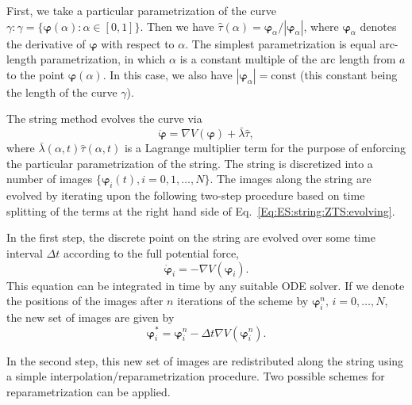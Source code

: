 First, we take a particular parametrization of the curve $\gamma:\gamma=\{\boldsymbol{\varphi}(\alpha):\alpha\in[0,1]\}$. Then we have $\hat{\tau}(\alpha)=\boldsymbol{\varphi}_\alpha/|\boldsymbol{\varphi}_\alpha|$, where $\boldsymbol{\varphi}_\alpha$ denotes the derivative of $\boldsymbol{\varphi}$ with respect to $\alpha$. The simplest parametrization is equal arc-length parametrization, in which $\alpha$ is a constant multiple of the arc length from $a$ to the point $\boldsymbol{\varphi}(\alpha)$. In this case, we also have $|\boldsymbol{\varphi}_\alpha|=\mathrm{const}$ (this constant being the length of the curve $\gamma$).

The string method evolves the curve via
\begin{equation}
    \dot{\boldsymbol{\varphi}}=\nabla V(\boldsymbol{\varphi})+\bar{\lambda}\hat{\tau},
    \label{Eq:ES:string:ZTS:evolving}
\end{equation}
where $\bar{\lambda}(\alpha,t)\hat{\tau}(\alpha,t)$ is a Lagrange multiplier term for the purpose of enforcing the particular parametrization of the string. The string is discretized into a number of images $\{\boldsymbol{\varphi}_i(t),i=0,1,\dots,N\}$. The images along the string are evolved by iterating upon the following two-step procedure based on time splitting of the terms at the right hand side of Eq.~\ref{Eq:ES:string:ZTS:evolving}.

In the first step, the discrete point on the string are evolved over some time interval $\Delta t$ according to the full potential force,
\begin{equation}
    \dot{\boldsymbol{\varphi}}_i=-\nabla V(\boldsymbol{\varphi}_i).
\end{equation}
This equation can be integrated in time by any suitable ODE solver. If we denote the positions of the images after $n$ iterations of the scheme by $\boldsymbol{\varphi}_i^n,\,i=0,\dots,N$, the new set of images are given by
\begin{equation}
    \boldsymbol{\varphi}_i^\ast=\boldsymbol{\varphi}_i^n-\Delta t\nabla V(\boldsymbol{\varphi}_i^n).
\end{equation}

In the second step, this new set of images are redistributed along the string using a simple interpolation/reparametrization procedure. Two possible schemes for reparametrization can be applied.

